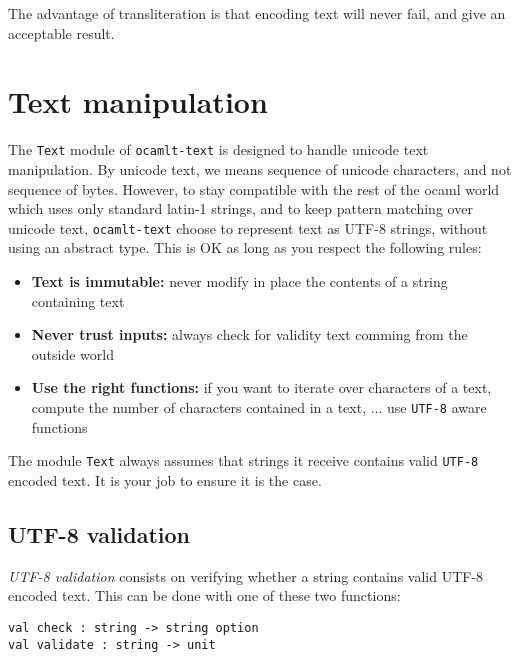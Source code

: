 \documentclass{article}
\newcommand{\oct}{\texttt{ocamlt-text}\xspace}
\begin{document}
The advantage of transliteration is that encoding text will never
fail, and give an acceptable result.

\section{Text manipulation}

The \texttt{Text} module of \oct is designed to handle unicode text
manipulation. By unicode text, we means sequence of unicode
characters, and not sequence of bytes. However, to stay compatible
with the rest of the ocaml world which uses only standard latin-1
strings, and to keep pattern matching over unicode text, \oct choose
to represent text as UTF-8 strings, without using an abstract
type. This is OK as long as you respect the following rules:

\begin{itemize}
\item \textbf{Text is immutable:} never modify in place the contents of
  a string containing text
\item \textbf{Never trust inputs:} always check for
  validity text comming from the outside world
\item \textbf{Use the right functions:} if you want to iterate over
  characters of a text, compute the number of characters contained
  in a text, ...  use \texttt{UTF-8} aware functions
\end{itemize}

The module \texttt{Text} always assumes that strings it receive
contains valid \texttt{UTF-8} encoded text. It is your job to ensure
it is the case.

\subsection{UTF-8 validation}

\emph{UTF-8 validation} consists on verifying whether a string
contains valid UTF-8 encoded text. This can be done with one of these
two functions:

\lstset{language=[Objective]Caml}\begin{lstlisting}
val check : string -> string option
val validate : string -> unit
\end{lstlisting}
\end{document}
